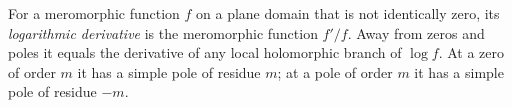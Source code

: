 
For a meromorphic function $f$ on a plane domain that is not identically zero, its \emph{logarithmic derivative} is the meromorphic function $f'/f$. Away from zeros and poles it equals the derivative of any local holomorphic branch of $\log f$. At a zero of order $m$ it has a simple pole of residue $m$; at a pole of order $m$ it has a simple pole of residue $-m$.
